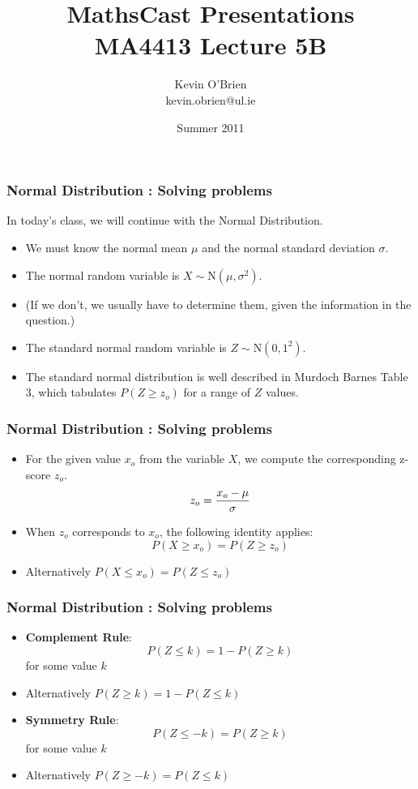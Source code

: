 \documentclass[a4]{beamer}
\title[MathsCast]{MathsCast Presentations \\ {\normalsize MA4413 Lecture 5B}}
\author[Kevin O'Brien]{Kevin O'Brien \\ {\scriptsize kevin.obrien@ul.ie}}
\date{Summer 2011}
\institute[Maths \& Stats]{Dept. of Mathematics \& Statistics, \\ University \textit{of} Limerick}
\begin{document}
\begin{frame}
\titlepage
\end{frame}

\begin{frame}
\frametitle{Normal Distribution : Solving problems}
In today's class, we will continue with the Normal Distribution.
\begin{itemize}
\item We must know the normal mean $\mu$ and the normal standard deviation $\sigma$.
\item The normal random variable is $X \sim \mbox{N} ( \mu , \sigma^2)$.
\item (If we don't, we usually have to determine them, given the information in the question.)
\item The standard normal random variable is $Z\sim \mbox{N} ( 0 , 1^2)$.
\item The standard normal distribution is well described in Murdoch Barnes Table 3, which tabulates $P(Z \geq z_o)$ for a range of $Z$ values.
\end{itemize}
\end{frame}
\begin{frame}
\frametitle{Normal Distribution : Solving problems}
\begin{itemize}
\item For the given value $x_o$ from the variable $X$, we compute the corresponding z-score $z_o$.
\[ z_o = { x_o - \mu \over \sigma} \]
\item When $z_o$ corresponds to $x_o$, the following identity applies:
\[  P(X \geq x_o )= P(Z \geq z_o ) \]
\item Alternatively $ P(X \leq x_o )= P(Z \leq z_o ) $
\end{itemize}
\end{frame}
\begin{frame}
\frametitle{Normal Distribution : Solving problems}
\begin{itemize}
\item \textbf{Complement Rule}: \[ P(Z \leq k) = 1-P(Z \geq k) \] for some value $k$
\item Alternatively $ P(Z \geq k) = 1-P(Z \leq k) $ 
\item \textbf{Symmetry Rule}: \[ P(Z \leq -k) = P(Z \geq k) \] for some value $k$
\item Alternatively $ P(Z \geq -k) = P(Z \leq k) $
\end{itemize}
\end{frame}
\end{document}

